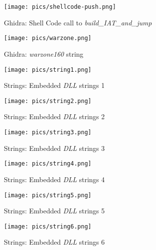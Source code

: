 \documentclass[10pt,a4paper]{article}
\begin{document}
\begin{figure}[!htbp]%
	\centering
	\texttt{[image: pics/shellcode-push.png]}
	\caption{Ghidra: Shell Code call to \textit{build\_IAT\_and\_jump}}
	\label{shellcode-push}
\end{figure}

\begin{figure}[!htbp]%
	\centering
	\texttt{[image: pics/warzone.png]}
	\caption{Ghidra: \textit{warzone160} string}
	\label{warzone}
\end{figure}

\begin{figure}[!htbp]%
	\centering
	\texttt{[image: pics/string1.png]}
	\caption{Strings: Embedded \textit{DLL} strings 1}
	\label{string1}
\end{figure}

\begin{figure}[!htbp]%
	\centering
	\texttt{[image: pics/string2.png]}
	\caption{Strings: Embedded \textit{DLL} strings 2}
	\label{string2}
\end{figure}

\begin{figure}[!htbp]%
	\centering
	\texttt{[image: pics/string3.png]}
	\caption{Strings: Embedded \textit{DLL} strings 3}
	\label{string3}
\end{figure}

\begin{figure}[!htbp]%
	\centering
	\texttt{[image: pics/string4.png]}
	\caption{Strings: Embedded \textit{DLL} strings 4}
	\label{string4}
\end{figure}

\begin{figure}[!htbp]%
	\centering
	\texttt{[image: pics/string5.png]}
	\caption{Strings: Embedded \textit{DLL} strings 5}
	\label{string5}
\end{figure}

\begin{figure}[!htbp]%
	\centering
	\texttt{[image: pics/string6.png]}
	\caption{Strings: Embedded \textit{DLL} strings 6}
	\label{string6}
\end{figure}
\end{document}
